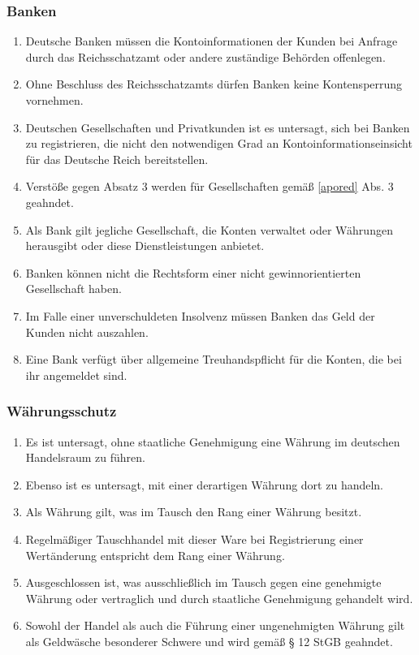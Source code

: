 \documentclass{article}
\begin{document}
\subsubsection{Banken}
\begin{enumerate}[(1)]
    \item Deutsche Banken müssen die Kontoinformationen der Kunden bei Anfrage durch das Reichsschatzamt oder andere zuständige Behörden offenlegen.
    \item Ohne Beschluss des Reichsschatzamts dürfen Banken keine Kontensperrung vornehmen.
    \item Deutschen Gesellschaften und Privatkunden ist es untersagt, sich bei Banken zu registrieren, die nicht den notwendigen Grad an Kontoinformationseinsicht für das Deutsche Reich bereitstellen.
    \item Verstöße gegen Absatz 3 werden für Gesellschaften gemäß \ref{apored} Abs. 3 geahndet.
    \item Als Bank gilt jegliche Gesellschaft, die Konten verwaltet oder Währungen herausgibt oder diese Dienstleistungen anbietet.
    \item Banken können nicht die Rechtsform einer nicht gewinnorientierten Gesellschaft haben.
    \item Im Falle einer unverschuldeten Insolvenz müssen Banken das Geld der Kunden nicht auszahlen.
    \item Eine Bank verfügt über allgemeine Treuhandspflicht für die Konten, die bei ihr angemeldet sind.
\end{enumerate}

\subsubsection{Währungsschutz}
\begin{enumerate}[(1)]
    \item Es ist untersagt, ohne staatliche Genehmigung eine Währung im deutschen Handelsraum zu führen.
    \item Ebenso ist es untersagt, mit einer derartigen Währung dort zu handeln.
    \item Als Währung gilt, was im Tausch den Rang einer Währung besitzt.
    \item Regelmäßiger Tauschhandel mit dieser Ware bei Registrierung einer Wertänderung entspricht dem Rang einer Währung.
    \item Ausgeschlossen ist, was ausschließlich im Tausch gegen eine genehmigte Währung oder vertraglich und durch staatliche Genehmigung gehandelt wird.
    \item Sowohl der Handel als auch die Führung einer ungenehmigten Währung gilt als Geldwäsche besonderer Schwere und wird gemäß § 12 StGB geahndet.
\end{enumerate}
\end{document}
